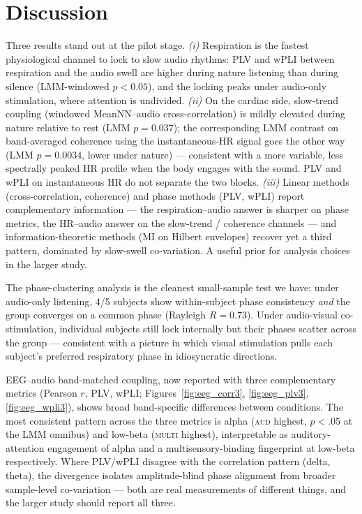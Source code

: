 \documentclass[11pt,a4paper]{article}
\begin{document}
\section{Discussion}

Three results stand out at the pilot stage. \emph{(i)} Respiration is the
fastest physiological channel to lock to slow audio rhythms: PLV and wPLI
between respiration and the audio swell are higher during nature listening
than during silence (LMM-windowed $p\!<\!0.05$), and the locking peaks
under audio-only stimulation, where attention is undivided. \emph{(ii)}
On the cardiac side, slow-trend coupling (windowed MeanNN--audio
cross-correlation) is mildly elevated during nature relative to rest
(LMM $p=0.037$); the corresponding LMM contrast on band-averaged
coherence using the instantaneous-HR signal goes the other way (LMM
$p=0.0034$, lower under nature) --- consistent with a more variable,
less spectrally peaked HR profile when the body engages with the
sound. PLV and wPLI on instantaneous HR do not separate the two
blocks. \emph{(iii)} Linear methods (cross-correlation, coherence)
and phase methods (PLV, wPLI) report complementary information ---
the respiration--audio answer is sharper on phase metrics, the
HR--audio answer on the slow-trend / coherence channels --- and
information-theoretic methods (MI on Hilbert envelopes) recover yet a
third pattern, dominated by slow-swell co-variation. A useful prior
for analysis choices in the larger study.

The phase-clustering analysis is the cleanest small-sample test we have:
under audio-only listening, 4/5 subjects show within-subject phase
consistency \emph{and} the group converges on a common phase (Rayleigh
$R=0.73$). Under audio-visual co-stimulation, individual subjects still
lock internally but their phases scatter across the group --- consistent
with a picture in which visual stimulation pulls each subject's preferred
respiratory phase in idiosyncratic directions.

EEG--audio band-matched coupling, now reported with three complementary
metrics (Pearson $r$, PLV, wPLI; Figures~\ref{fig:eeg_corr3},
\ref{fig:eeg_plv3}, \ref{fig:eeg_wpli3}), shows broad band-specific
differences between conditions. The most consistent pattern across the
three metrics is alpha (\textsc{aud} highest, $p<.05$ at the LMM
omnibus) and low-beta (\textsc{multi} highest), interpretable as
auditory-attention engagement of alpha and a multisensory-binding
fingerprint at low-beta respectively. Where PLV/wPLI disagree with
the correlation pattern (delta, theta), the divergence isolates
amplitude-blind phase alignment from broader sample-level
co-variation --- both are real measurements of different things, and
the larger study should report all three.
\end{document}
